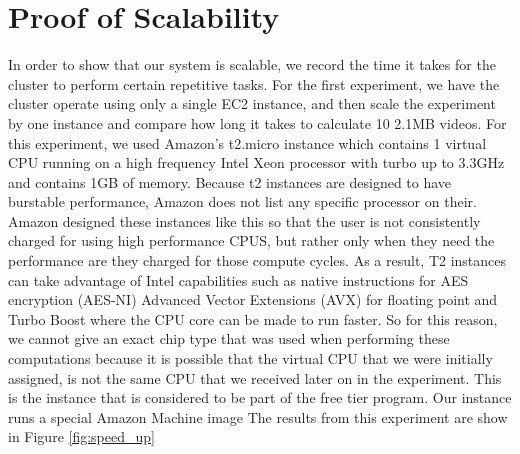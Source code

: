 \section{\label{section:scalability}Proof of Scalability}
In order to show that our system is scalable, we record the time it takes for
the cluster to perform certain repetitive tasks. For the first experiment, we
have the cluster operate using only a single EC2 instance, and then scale the
experiment by one instance and compare how long it takes to calculate 10 2.1MB
videos. For this experiment, we used Amazon's t2.micro instance which contains 1
virtual CPU running on a high frequency Intel Xeon processor with turbo up to
3.3GHz and contains 1GB of memory. Because t2 instances are designed to  have
burstable performance, Amazon does not list any specific processor on their.
Amazon designed
these instances like this so that the user is not consistently charged  for using
high performance CPUS, but rather only when they need the performance are  they
charged for those compute cycles. As a result, T2 instances can take
advantage of Intel capabilities such as native instructions for AES
encryption (AES-NI) Advanced Vector Extensions (AVX) for floating point and
Turbo Boost where the CPU core can be made to run faster. So for this reason, we
cannot give an exact chip type that was used when performing these computations
because it is possible that the virtual CPU that we were initially assigned, is
not the same CPU that we received later on in the experiment. This is the
instance that is considered to be part of the free tier program. Our instance
runs a special Amazon Machine image The results from this experiment are show in
Figure
\ref{fig:speed_up}



